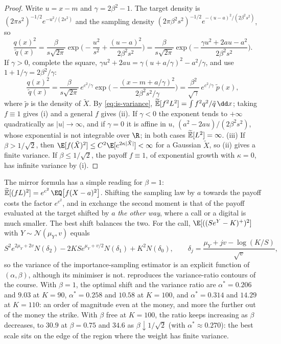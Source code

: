 \begin{proof}
Write $u=x-m$ and $\gamma=2\beta^2-1$. The target density is
$(2\pi s^2)^{-1/2}e^{-u^2/(2s^2)}$ and the sampling density
$(2\pi\beta^2s^2)^{-1/2}e^{-(u-a)^2/(2\beta^2s^2)}$, so
\[
  \frac{q(x)^2}{\tilde q(x)}=\frac{\beta}{s\sqrt{2\pi}}\exp\Big(-\frac{u^2}{s^2}+\frac{(u-a)^2}{2\beta^2s^2}\Big)
  =\frac{\beta}{s\sqrt{2\pi}}\exp\Big(-\frac{\gamma u^2+2au-a^2}{2\beta^2s^2}\Big).
\]
If $\gamma>0$, complete the square, $\gamma u^2+2au=\gamma(u+a/\gamma)^2-a^2/\gamma$, and use
$1+1/\gamma=2\beta^2/\gamma$:
\[
  \frac{q(x)^2}{\tilde q(x)}=\frac{\beta}{s\sqrt{2\pi}}\,e^{c^2/\gamma}
  \exp\Big(-\frac{(x-m+a/\gamma)^2}{2\beta^2s^2/\gamma}\Big)
  =\frac{\beta^2}{\sqrt\gamma}\,e^{c^2/\gamma}\;\tilde p(x),
\]
where $\tilde p$ is the density of $\tilde X$. By \eqref{eq:is-variance},
$\Et[f^2L^2]=\int f^2q^2/\tilde q\,\dd x$; taking $f\equiv1$ gives (i) and a general $f$ gives
(ii). If $\gamma<0$ the exponent tends to $+\infty$ quadratically as $|u|\to\infty$, and if
$\gamma=0$ it is affine in $u$, $(a^2-2au)/(2\beta^2s^2)$, whose exponential is not integrable
over $\R$; in both cases $\widetilde{\mathbb E}[L^2]=\infty$.
(iii) If $\beta>1/\sqrt2$, then $\E[f(\tilde X)^2]\le C^2\E[e^{2\kappa|\tilde X|}]<\infty$
for a Gaussian $\tilde X$, so (ii) gives a finite variance. If $\beta\le1/\sqrt2$, the payoff
$f\equiv1$, of exponential growth with $\kappa=0$, has infinite variance by (i).
\end{proof}

The mirror formula has a simple reading for $\beta=1$:
$\Et[(fL)^2]=e^{c^2}\,\EQ\big[f(X-a)^2\big]$. Shifting the sampling law by $a$ towards the
payoff costs the factor $e^{c^2}$, and in exchange the second moment is that of the payoff
evaluated at the target shifted by $a$ \emph{the other way}, where a call or a digital is
much smaller. The best shift balances the two. For the call,
$\E[((Se^{Y}-K)^+)^2]$ with $Y\sim\mathcal N(\mu_Y,v)$ equals
\[
  S^2e^{2\mu_Y+2v}N(\delta_2)-2KSe^{\mu_Y+v/2}N(\delta_1)+K^2N(\delta_0),\qquad
  \delta_j=\frac{\mu_Y+jv-\log(K/S)}{\sqrt v},
\]
so the variance of the importance-sampling estimator is an explicit function of $(\alpha,\beta)$,
although its minimiser is not.  reproduces the variance-ratio contours of
the course. With $\beta=1$, the optimal shift and the variance ratio are $\alpha^*=0.206$ and
$9.03$ at $K=90$, $\alpha^*=0.258$ and $10.58$ at $K=100$, and $\alpha^*=0.314$ and $14.29$
at $K=110$: an order of magnitude even at the money, and more the further out of the money
the strike. With $\beta$ free at $K=100$, the ratio keeps increasing as $\beta$ decreases,
to $30.9$ at $\beta=0.75$ and $34.6$ as $\beta\downarrow1/\sqrt2$ (with $\alpha^*\approx0.270$):
the best scale sits on the edge of the region where the weight has finite variance.

